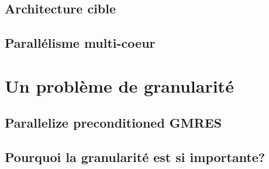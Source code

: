 \documentclass[oneside,12t]{classes/Thesis}
\begin{document}
\section{Architecture cible}



%



\section{Parallélisme multi-coeur}











\chapter{Un problème de granularité}
\minitoc
\vspace{1cm}
\section{Parallelize preconditioned GMRES}



\section{Pourquoi la granularité est si importante?}




\end{document}

